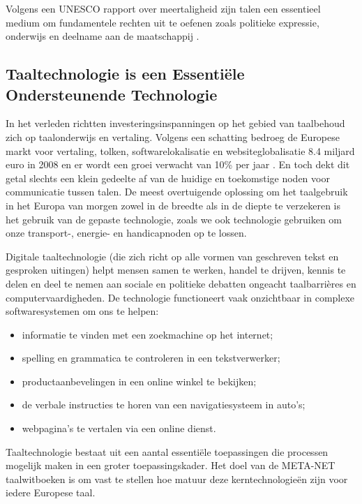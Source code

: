 \documentclass[]{../../metanetpaper}
\begin{document}
\begin{multicols}{2}
Volgens een UNESCO rapport over meertaligheid zijn talen een essentieel medium om fundamentele rechten uit te oefenen zoals politieke expressie, onderwijs en deelname aan de maatschappij \cite{Unesco1}.


\subsection{Taaltechnologie is een Essenti{\"e}le Ondersteunende Technologie}

    In het verleden richtten investeringsinspanningen op het gebied van taalbehoud zich op taalonderwijs en vertaling. Volgens een schatting bedroeg de Europese markt voor vertaling, tolken, softwarelokalisatie en websiteglobalisatie 8.4 miljard euro in 2008 en er wordt een groei verwacht van 10\% per jaar \cite{EC3}.  En toch dekt dit getal slechts een klein gedeelte af van de huidige en toekomstige noden voor communicatie tussen talen. De meest overtuigende oplossing om het taalgebruik in het Europa van morgen zowel in de breedte als in de diepte te verzekeren is het gebruik van de gepaste technologie, zoals we ook technologie gebruiken om onze transport-, energie- en handicapnoden op te lossen.

    Digitale taaltechnologie (die zich richt op alle vormen van geschreven tekst en gesproken uitingen) helpt mensen samen te werken, handel te drijven, kennis te delen en deel te nemen aan sociale en politieke debatten ongeacht taalbarri{\`e}res en computervaardigheden. De technologie functioneert vaak onzichtbaar in complexe softwaresystemen om ons te helpen:
    \begin{itemize}
 	\item informatie te vinden met een zoekmachine op het internet;
 	\item spelling en grammatica te controleren in een tekstverwerker;
 	\item productaanbevelingen in een online winkel te bekijken;
 	\item de verbale instructies te horen van een navigatiesysteem in auto's;
 	\item webpagina's te vertalen via een online dienst.
    \end{itemize}

    Taaltechnologie bestaat uit een aantal essenti{\"e}le toepassingen die processen mogelijk maken in een groter toepassingskader. Het doel van de META-NET taalwitboeken is om vast te stellen hoe matuur deze kerntechnologie{\"e}n zijn voor iedere Europese taal.


\end{multicols}
\end{document}
